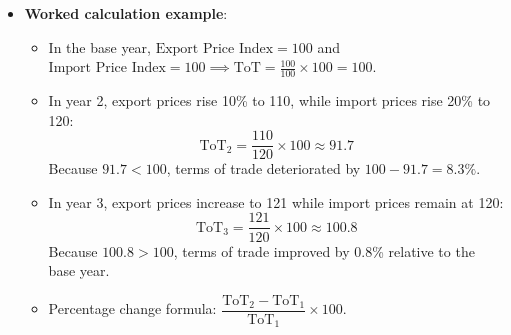 \begin{itemize}
\begin{itemize}
  \end{itemize}
  \item \textbf{Worked calculation example}:
  \begin{itemize}
    \item In the base year, $\text{Export Price Index} = 100$ and $\text{Import Price Index} = 100 \implies \text{ToT} = \frac{100}{100} \times 100 = 100$.
    \item In year 2, export prices rise 10\% to 110, while import prices rise 20\% to 120:
    \[\text{ToT}_2 = \dfrac{110}{120} \times 100 \approx 91.7\]
    Because $91.7 < 100$, terms of trade deteriorated by $100 - 91.7 = 8.3\%$.
    \item In year 3, export prices increase to 121 while import prices remain at 120:
    \[\text{ToT}_3 = \dfrac{121}{120} \times 100 \approx 100.8\]
    Because $100.8 > 100$, terms of trade improved by 0.8\% relative to the base year.
    \item Percentage change formula: $\dfrac{\text{ToT}_2 - \text{ToT}_1}{\text{ToT}_1} \times 100$.
  \end{itemize}
\end{itemize}

